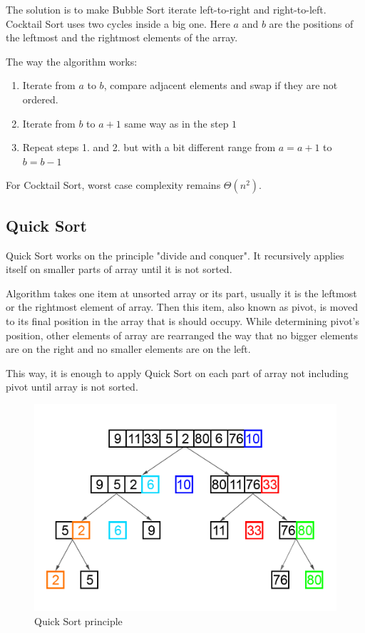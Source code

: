 \documentclass[
  field=inf,
  biblatex,
  language=english,
  glossaries,
  theorems=false,
  sourcecodes=false,
  index
]{kidiplom}
\begin{document}
The solution is to make Bubble Sort iterate left-to-right and right-to-left. Cocktail Sort uses two cycles inside a big one. Here $a$ and $b$ are the positions of the leftmost and the rightmost elements of the array.

The way the algorithm works:

\begin{enumerate}
 \item Iterate from $a$ to $b$, compare adjacent elements and swap if they are not ordered.
 \item Iterate from $b$ to $a + 1$ same way as in the step $1$
 \item Repeat steps 1. and 2. but with a bit different range from $a = a + 1$ to $b = b - 1$
\end{enumerate}

For Cocktail Sort, worst case complexity remains $\Theta(n^2)$.

\subsection{Quick Sort}
\label{sec:quicksort}
Quick Sort works on the principle "divide and conquer". It recursively applies itself on smaller parts of array until it is not sorted.

Algorithm takes one item at unsorted array or its part, usually it is the leftmost or the rightmost element of array. Then this item, also known as pivot, is moved to its final position in the array that is should occupy. While determining pivot's position, other elements of array are rearranged the way that no bigger elements are on the right and no smaller elements are on the left.

This way, it is enough to apply Quick Sort on each part of array not including pivot until array is not sorted.

\begin{figure}[H]
\begin{center}
	
	\includegraphics[scale=0.35]{img/Quicksort.png}
	\caption{Quick Sort principle}\label{fig:insert}
\end{center}
\end{figure}
\end{document}
